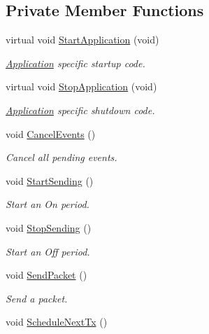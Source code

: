 \subsection*{Private Member Functions}
\begin{DoxyCompactItemize}
\item 
virtual void \hyperlink{classns3_1_1OnOffApplication_a0d9d5f0f60ec877c788c5c0e55c9587b}{Start\+Application} (void)
\begin{DoxyCompactList}\small\item\em \hyperlink{classns3_1_1Application}{Application} specific startup code. \end{DoxyCompactList}\item 
virtual void \hyperlink{classns3_1_1OnOffApplication_a944980f8e00a8dcfb14fd4d915396ef7}{Stop\+Application} (void)
\begin{DoxyCompactList}\small\item\em \hyperlink{classns3_1_1Application}{Application} specific shutdown code. \end{DoxyCompactList}\item 
void \hyperlink{classns3_1_1OnOffApplication_afb253c6f54b73e7ca4599ad5541bce5c}{Cancel\+Events} ()
\begin{DoxyCompactList}\small\item\em Cancel all pending events. \end{DoxyCompactList}\item 
void \hyperlink{classns3_1_1OnOffApplication_ac3d42b6fa582b938e0197c1b8c015583}{Start\+Sending} ()
\begin{DoxyCompactList}\small\item\em Start an On period. \end{DoxyCompactList}\item 
void \hyperlink{classns3_1_1OnOffApplication_ab84ce405602879567f051a16ff8518a8}{Stop\+Sending} ()
\begin{DoxyCompactList}\small\item\em Start an Off period. \end{DoxyCompactList}\item 
void \hyperlink{classns3_1_1OnOffApplication_afe6fb4d4e772370c797b722dbe6f7e3f}{Send\+Packet} ()
\begin{DoxyCompactList}\small\item\em Send a packet. \end{DoxyCompactList}\item 
void \hyperlink{classns3_1_1OnOffApplication_a654fc8acee0ccc66f1c736a06c5e149d}{Schedule\+Next\+Tx} ()

\end{DoxyCompactItemize}
